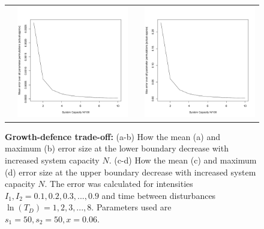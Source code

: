 \begin{figure}[th]
\begin{tabular}{rrrr}
  &\includegraphics[width=2.5in]{GDtmeanerr.pdf} && \includegraphics[width=2.5in]{GDtmaxerr.pdf} \end{tabular}
  \label{{fig:gdtoapprox}}
   \caption{\textbf{Growth-defence trade-off:} (a-b)  How the mean (a) and maximum (b) error size at the lower boundary decrease with increased system capacity $N$. (c-d) How the mean (c) and maximum (d) error size at the upper boundary decrease with increased system capacity $N$. The error was calculated for intensities $I_1,I_2=0.1,0.2,0.3,...,0.9$ and time between disturbances $\ln(T_D)=1,2,3,...,8.$ Parameters used are $s_1=50,s_2=50,x=0.06$.}
    \end{figure}
